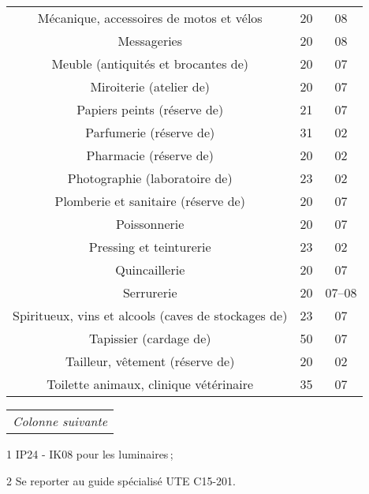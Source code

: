 \begin{minipage}[t]{0.49\linewidth}
\begin{tabularx}{\textwidth}[t]{c X c c}
\multicolumn{2}{p{4.8cm}}{Mécanique, accessoires de motos et vélos}							&	20				&	08 \\
\multicolumn{2}{p{4.8cm}}{Messageries}																		&	20				&	08 \\
\multicolumn{2}{p{4.8cm}}{Meuble (antiquités et brocantes de)}										&	20				&	07 \\
\multicolumn{2}{p{4.8cm}}{Miroiterie (atelier de)}															&	20				&	07 \\
\multicolumn{2}{p{4.8cm}}{Papiers peints (réserve de)}													&	21				&	07 \\
\multicolumn{2}{p{4.8cm}}{Parfumerie (réserve de)}														&	31				&	02 \\
\multicolumn{2}{p{4.8cm}}{Pharmacie (réserve de)}														&	20				&	02 \\
\multicolumn{2}{p{4.8cm}}{Photographie (laboratoire de)}												&	23				&	02 \\
\multicolumn{2}{p{4.8cm}}{Plomberie et sanitaire (réserve de)}										&	20				&	07 \\
\multicolumn{2}{p{4.8cm}}{Poissonnerie}																		&	20				&	07 \\
\multicolumn{2}{p{4.8cm}}{Pressing et teinturerie}															&	23				&	02 \\
\multicolumn{2}{p{4.8cm}}{Quincaillerie}																		&	20				&	07 \\
\multicolumn{2}{p{4.8cm}}{Serrurerie}																			&	20				&	07--08 \\
\multicolumn{2}{p{4.8cm}}{Spiritueux, vins et alcools (caves de stockages de)}				&	23				&	07 \\
\multicolumn{2}{p{4.8cm}}{Tapissier (cardage de)}															&	50				&	07 \\
\multicolumn{2}{p{4.8cm}}{Tailleur, vêtement (réserve de)}											&	20				&	02 \\
\multicolumn{2}{p{4.8cm}}{Toilette animaux, clinique vétérinaire}									&	35				&	07 \\
\bottomrule
\end{tabularx}
\end{minipage}
\begin{minipage}[b]{0.49\textwidth}
\begin{threeparttable}
\begin{tabularx}{\textwidth}[b]{R}
\midrule
\small\textit{Colonne suivante} \\
\end{tabularx}
\begin{tablenotes}
    \item[1] IP24 - IK08 pour les luminaires\,;
    \item[2] Se reporter au guide spécialisé UTE C15-201.
\end{tablenotes}
\end{threeparttable}
\end{minipage}

%

